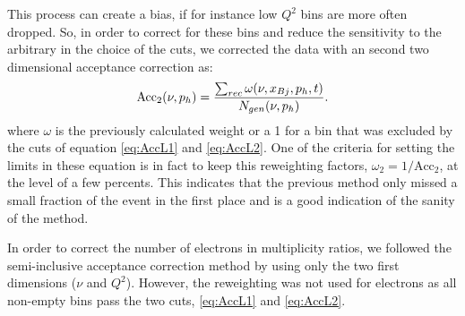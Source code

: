 This process can create a bias, if for instance low $Q^2$ bins are more often dropped.
So, in order to correct for these bins and reduce the sensitivity to the arbitrary in
the choice of the cuts, we corrected the data with an second two dimensional 
acceptance correction as:
\begin{equation}
\text{Acc}_2(\nu,p_h) = {\sum_{rec} \omega (\nu,x_{Bj},p_h,t)\over N_{gen}(\nu,p_h)}.
\end{equation}
where $\omega$ is the previously calculated weight or a 1 for a bin that was excluded by the 
cuts of equation \ref{eq:AccL1} and \ref{eq:AccL2}. One of the criteria for setting the limits 
in these equation is in fact to keep this reweighting factors, $\omega_2 = 1/\text{Acc}_2$, at 
the level of a few percents. This indicates that the previous method only missed a small 
fraction of the event in the first place and is a good indication of the sanity of the method.

In order to correct the number of electrons in multiplicity ratios, we followed the 
semi-inclusive acceptance correction method by using only the two first dimensions 
($\nu$ and $Q^2$). However, the reweighting was not used for electrons as all 
non-empty bins pass the two cuts, \ref{eq:AccL1} and \ref{eq:AccL2}.

